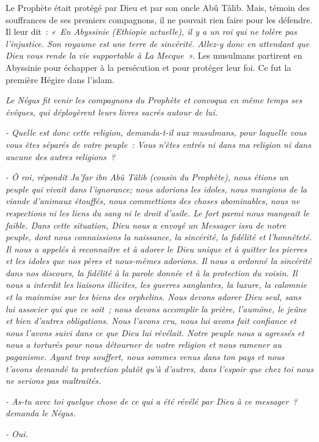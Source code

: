 Le Prophète était protégé par Dieu et par son oncle Abû Tâlib. Mais,
témoin des souffrances de ses premiers compagnons, il ne pouvait rien
faire pour les défendre. Il leur dit~: \emph{«~En Abyssinie (Ethiopie
actuelle), il y a un roi qui ne tolère pas l'injustice. Son royaume est
une terre de sincérité. Allez-y donc en attendant que Dieu vous rende la
vie supportable à La Mecque~».} Les musulmans partirent en Abyssinie
pour échapper à la persécution et pour protéger leur foi. Ce fut la
première Hégire dans l'islam.

\emph{Le Négus fit venir les compagnons du Prophète et convoqua en même
temps ses évêques, qui déployèrent leurs livres sacrés autour de lui.}

\emph{- Quelle est donc cette religion, demanda-t-il aux musulmans, pour
laquelle vous vous êtes séparés de votre peuple~: Vous n'êtes entrés ni
dans ma religion ni dans aucune des autres religions~?}

\emph{- Ô roi, répondit Ja'far ibn Abû Tâlib (cousin du Prophète), nous
étions un peuple qui vivait dans l'ignorance; nous adorions les idoles,
nous mangions de la viande d'animaux étouffés, nous commettions des
choses abominables, nous ne respections ni les liens du sang ni le droit
d'asile. Le fort parmi nous mangeait le faible. Dans cette situation,
Dieu nous a envoyé un Messager issu de notre peuple, dont nous
connaissions la naissance, la sincérité, la fidélité et l'honnêteté. Il
nous a appelés à reconnaître et à adorer le Dieu unique et à quitter les
pierres et les idoles que nos pères et nous-mêmes adorions. Il nous a
ordonné la sincérité dans nos discours, la fidélité à la parole donnée
et à la protection du voisin. Il nous a interdit les liaisons illicites,
les guerres sanglantes, la luxure, la calomnie et la mainmise sur les
biens des orphelins. Nous devons adorer Dieu seul, sans lui associer qui
que ce soit~; nous devons accomplir la prière, l'aumône, le jeûne et
bien d'autres obligations. Nous l'avons cru, nous lui avons fait
confiance et nous l'avons suivi dans ce que Dieu lui révélait. Notre
peuple nous a agressés et nous a torturés pour nous détourner de notre
religion et nous ramener au paganisme. Ayant trop souffert, nous sommes
venus dans ton pays et nous t'avons demandé ta protection plutôt qu'à
d'autres, dans l'espoir que chez toi nous ne serions pas maltraités.}

\emph{- As-tu avec toi quelque chose de ce qui a été révélé par Dieu à
ce messager~? demanda le Négus.}

\emph{- Oui.}

